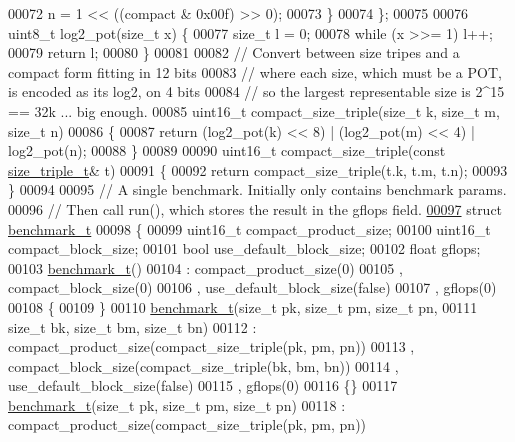 \begin{DoxyCode}
00072     n = 1 << ((compact & 0x00f) >> 0);
00073   \}
00074 \};
00075 
00076 uint8\_t log2\_pot(\textcolor{keywordtype}{size\_t} x) \{
00077   \textcolor{keywordtype}{size\_t} l = 0;
00078   \textcolor{keywordflow}{while} (x >>= 1) l++;
00079   \textcolor{keywordflow}{return} l;
00080 \}
00081 
00082 \textcolor{comment}{// Convert between size tripes and a compact form fitting in 12 bits}
00083 \textcolor{comment}{// where each size, which must be a POT, is encoded as its log2, on 4 bits}
00084 \textcolor{comment}{// so the largest representable size is 2^15 == 32k  ... big enough.}
00085 uint16\_t compact\_size\_triple(\textcolor{keywordtype}{size\_t} k, \textcolor{keywordtype}{size\_t} m, \textcolor{keywordtype}{size\_t} n)
00086 \{
00087   \textcolor{keywordflow}{return} (log2\_pot(k) << 8) | (log2\_pot(m) << 4) | log2\_pot(n);
00088 \}
00089 
00090 uint16\_t compact\_size\_triple(\textcolor{keyword}{const} \hyperlink{structsize__triple__t}{size\_triple\_t}& t)
00091 \{
00092   \textcolor{keywordflow}{return} compact\_size\_triple(t.k, t.m, t.n);
00093 \}
00094 
00095 \textcolor{comment}{// A single benchmark. Initially only contains benchmark params.}
00096 \textcolor{comment}{// Then call run(), which stores the result in the gflops field.}
\hyperlink{structbenchmark__t}{00097} \textcolor{keyword}{struct }\hyperlink{structbenchmark__t}{benchmark\_t}
00098 \{
00099   uint16\_t compact\_product\_size;
00100   uint16\_t compact\_block\_size;
00101   \textcolor{keywordtype}{bool} use\_default\_block\_size;
00102   \textcolor{keywordtype}{float} gflops;
00103   \hyperlink{structbenchmark__t}{benchmark\_t}()
00104     : compact\_product\_size(0)
00105     , compact\_block\_size(0)
00106     , use\_default\_block\_size(\textcolor{keyword}{false})
00107     , gflops(0)
00108   \{
00109   \}
00110   \hyperlink{structbenchmark__t}{benchmark\_t}(\textcolor{keywordtype}{size\_t} pk, \textcolor{keywordtype}{size\_t} pm, \textcolor{keywordtype}{size\_t} pn,
00111               \textcolor{keywordtype}{size\_t} bk, \textcolor{keywordtype}{size\_t} bm, \textcolor{keywordtype}{size\_t} bn)
00112     : compact\_product\_size(compact\_size\_triple(pk, pm, pn))
00113     , compact\_block\_size(compact\_size\_triple(bk, bm, bn))
00114     , use\_default\_block\_size(\textcolor{keyword}{false})
00115     , gflops(0)
00116   \{\}
00117   \hyperlink{structbenchmark__t}{benchmark\_t}(\textcolor{keywordtype}{size\_t} pk, \textcolor{keywordtype}{size\_t} pm, \textcolor{keywordtype}{size\_t} pn)
00118     : compact\_product\_size(compact\_size\_triple(pk, pm, pn))

\end{DoxyCode}
